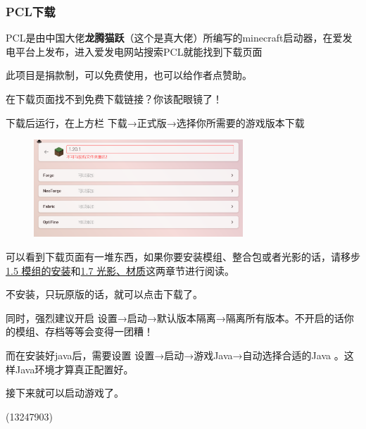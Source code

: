 \documentclass[UTF8,a4paper]{article}
\begin{document}
			\subsubsection{PCL下载}
				\par PCL是由中国大佬\textbf{龙腾猫跃}（这个是真大佬）所编写的minecraft启动器，在爱发电平台上发布，进入爱发电网站搜索PCL就能找到下载页面
				\par 此项目是捐款制，可以免费使用，也可以给作者点赞助。
				\par 在下载页面找不到免费下载链接？你该配眼镜了！
				\par 下载后运行，在上方栏 下载→正式版→选择你所需要的游戏版本下载
				\begin{figure}[H] %
					\centering %
					\includegraphics[width=0.7\textwidth]{./Pictures/PCL_1.jpg} %
				\end{figure}
				\par 可以看到下载页面有一堆东西，如果你要安装模组、整合包或者光影的话，请移步\hyperlink{modsinstall}{1.5 模组的安装}和\hyperlink{guangying}{1.7 光影、材质}这两章节进行阅读。
				\par 不安装，只玩原版的话，就可以点击下载了。
				\par 同时，强烈建议开启 设置→启动→默认版本隔离→隔离所有版本。不开启的话你的模组、存档等等会变得一团糟！
				\par 而在安装好java后，需要设置 设置→启动→游戏Java→自动选择合适的Java 。这样Java环境才算真正配置好。
				\par 接下来就可以启动游戏了。
				\begin{flushright}(13247903)\end{flushright}
\end{document}
